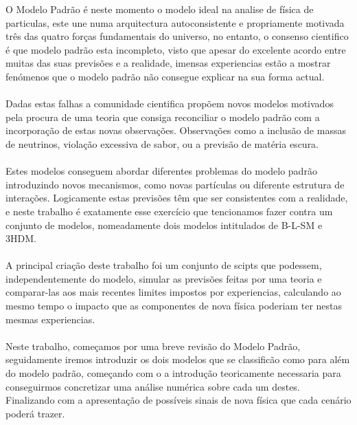 \documentclass[10pt]{report}
\renewcommand{\(}{\left(}
\renewcommand{\)}{\right)}
\renewcommand{\[}{\left[}
\renewcommand{\]}{\right]}
\begin{document}
\TitlePage
  \vspace*{55mm}
       {O Modelo Padrão é neste momento o modelo ideal na analise de física de particulas, este une numa arquitectura autoconsistente e propriamente motivada três das quatro forças fundamentais do universo, no entanto, o consenso cientifico é que modelo padrão esta incompleto, visto que apesar do excelente acordo entre muitas das suas previsões e a realidade, imensas experiencias estão a mostrar fenómenos que o modelo padrão não consegue explicar na sua forma actual. 
       \\ \ \\ 
       Dadas estas falhas a comunidade cientifica propõem novos modelos motivados pela procura de uma teoria que consiga reconciliar o modelo padrão com a incorporação de estas novas observações. Observações como a inclusão de massas de neutrinos, violação excessiva de sabor, ou a previsão de matéria escura. 
       \\ \ \\ 
       Estes modelos conseguem abordar diferentes problemas do modelo padrão introduzindo novos mecanismos, como novas partículas ou diferente estrutura de interações. Logicamente estas previsões têm que ser consistentes com a realidade, e neste trabalho é exatamente esse exercício que tencionamos fazer contra um conjunto de modelos, nomeadamente dois modelos intitulados de B-L-SM e 3HDM. 
       \\ \ \\
       A principal criação deste trabalho foi um conjunto de scipts que podessem, independentemente do modelo, simular as previsões feitas por uma teoria e comparar-las aos mais recentes limites impostos por experiencias, calculando ao mesmo tempo o impacto que as componentes de nova física poderiam ter nestas mesmas experiencias.  
       \\ \ \\
       Neste trabalho, começamos por uma breve revisão do Modelo Padrão, seguidamente iremos introduzir os dois modelos que se classificão como para além do modelo padrão, começando com o a introdução teoricamente necessaria para conseguirmos concretizar uma análise numérica sobre cada um destes. Finalizando com a apresentação de possíveis sinais de nova física que cada cenário poderá trazer.%
       }
\EndTitlePage
\titlepage\ \endtitlepage %
\end{document}
